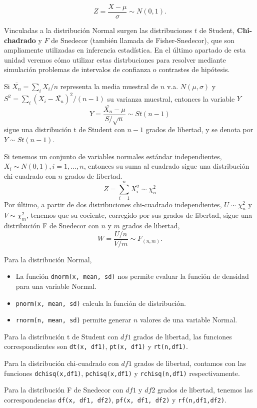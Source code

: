 \documentclass[
]{book}
\providecommand{\tightlist}{%
  \setlength{\itemsep}{0pt}\setlength{\parskip}{0pt}}
\newenvironment{whitebox}{
  \definecolor{shadecolor}{rgb}{255, 255, 255}  
  \color{black}
  \begin{shaded}}
 {\end{shaded}}
\theoremstyle{definition}
\theoremstyle{definition}
\theoremstyle{definition}
\theoremstyle{definition}
\theoremstyle{remark}
\begin{document}
\[Z = \frac{X - \mu}{\sigma} \sim N(0,1).\]

Vinculadas a la distribución Normal surgen las distribuciones \(t\) de Student, \textbf{Chi-chadrado} y \(F\) de Snedecor (también llamada de Fisher-Snedecor), que son ampliamente utilizadas en inferencia estadística. En el último apartado de esta unidad veremos cómo utilizar estas distrbuciones para resolver mediante simulación problemas de intervalos de confianza o contrastes de hipótesis.

Si \(\bar{X_n}=\sum_i X_i/n\) representa la media muestral de \(n\) v.a. \(N(\mu,\sigma)\) y \(S^2=\sum_i(X_i-\bar{X_n})^2/(n-1)\) su varianza muestral, entonces la variable \(Y\) \[ Y= \frac{\bar{X_n}-\mu}{S/\sqrt{n}}\sim St(n-1)\] sigue una distribución t de Student con \(n-1\) grados de libertad, y se denota por \(Y\sim St(n-1)\).

Si tenemos un conjunto de variables normales estándar independientes, \(X_i\sim N(0,1), i=1,\ldots,n\), entonces su suma al cuadrado sigue una distribución chi-cuadrado con \(n\) grados de libertad. \[Z=\sum_{i=1}^n X_i^2 \sim \chi^2_{n}\] Por último, a partir de dos distribuciones chi-cuadrado independientes, \(U\sim \chi^2_n\) y \(V\sim \chi^2_m\), tenemos que su cociente, corregido por sus grados de libertad, sigue una distribución F de Snedecor con \(n\) y \(m\) grados de libertad, \[ W=\frac{U/n}{V/m} \sim F_{(n,m)}.\]

\begin{whitebox}
Para la distribución Normal,

\begin{itemize}
\tightlist
\item
  La función \texttt{dnorm(x,\ mean,\ sd)} nos permite evaluar la función de densidad para una variable Normal.
\item
  \texttt{pnorm(x,\ mean,\ sd)} calcula la función de distribución.
\item
  \texttt{rnorm(n,\ mean,\ sd)} permite generar \(n\) valores de una variable Normal.
\end{itemize}

Para la distribución t de Student con \(df1\) grados de libertad, las funciones correspondientes son \texttt{dt(x,\ df1)}, \texttt{pt(x,\ df1)} y \texttt{rt(n,df1)}.

Para la distribución chi-cuadrado con \(df1\) grados de libertad, contamos con las funciones \texttt{dchisq(x,df1)}, \texttt{pchisq(x,df1)} y \texttt{rchisq(n,df1)} respectivamente.

Para la distribución F de Snedecor con \(df1\) y \(df2\) grados de libertad, tenemos las correspondencias \texttt{df(x,\ df1,\ df2)}, \texttt{pf(x,\ df1,\ df2)} y \texttt{rf(n,df1,df2)}.

\end{whitebox}
\end{document}
